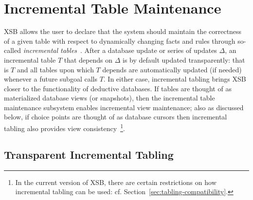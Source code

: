 \section{Incremental Table Maintenance} \label{sec:incremental_tabling}


XSB allows the user to declare that the system should maintain the
correctness of a given table with respect to dynamically changing
facts and rules through so-called {\em incremental
  tables}~\cite{SaRa05,Saha06,Swif14}.
After a database update or series of updates $\Delta$, an incremental
table $T$ that depends on $\Delta$ is by default updated
transparently: that is $T$ and all tables upon which $T$ depends are
automatically updated (if needed) whenever a future subgoal calls $T$.
%
In either case, incremental tabling brings XSB closer to the
functionality of deductive databases.  If tables are thought of as
materialized database views (or snapshots), then the incremental table
maintenance subsystem enables incremental view maintenance; also as
discussed below, if choice points are thought of as database cursors
then incremental tabling also provides view consistency~\footnote{In
  the current version of XSB, there are certain restrictions on how
  incremental tabling can be used:
  cf. Section~\ref{sec:tabling-compatibility}.}.

\subsection{Transparent Incremental Tabling} \label{sec:incr_examples}

